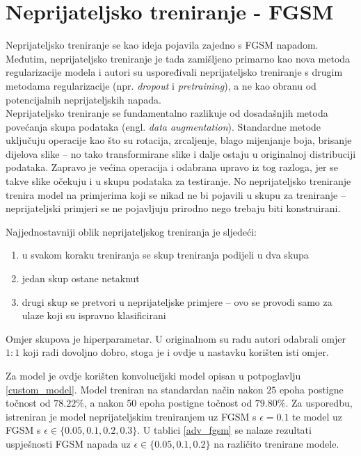 \documentclass[utf8, diplomski]{fer}
\begin{document}
\section{Neprijateljsko treniranje - FGSM}
Neprijateljsko treniranje se kao ideja pojavila zajedno s FGSM napadom\citep{Goodfellow2015ExplainingAH}. Međutim, neprijateljsko treniranje je tada zamišljeno primarno kao nova metoda regularizacije modela i autori su uspoređivali neprijateljsko treniranje s drugim metodama regularizacije (npr. \textit{dropout} i \textit{pretraining}), a ne kao obranu od potencijalnih neprijateljskih napada. \\
Neprijateljsko treniranje se fundamentalno razlikuje od dosadašnjih metoda povećanja skupa podataka (engl. \textit{data augmentation}). Standardne metode uključuju operacije kao što su rotacija, zrcaljenje, blago mijenjanje boja, brisanje dijelova slike -- no tako transformirane slike i dalje ostaju u originalnoj distribuciji podataka. Zapravo je većina operacija i odabrana upravo iz tog razloga, jer se takve slike očekuju i u skupu podataka za testiranje. No neprijateljsko treniranje trenira model na primjerima koji se nikad ne bi pojavili u skupu za treniranje -- neprijateljski primjeri se ne pojavljuju prirodno nego trebaju biti konstruirani. \par
Najjednostavniji oblik neprijateljskog treniranja je sljedeći:
\begin{enumerate}[noitemsep, label=\textbullet]
  \item u svakom koraku treniranja se skup treniranja podijeli u dva skupa
  \item jedan skup ostane netaknut
  \item drugi skup se pretvori u neprijateljske primjere -- ovo se provodi samo za ulaze koji su ispravno klasificirani
\end{enumerate} 
Omjer skupova je hiperparametar. U originalnom su radu autori odabrali omjer $1:1$ koji radi dovoljno dobro, stoga je i ovdje u nastavku korišten isti omjer.
\par
Za model je ovdje korišten konvolucijski model opisan u potpoglavlju \ref{custom_model}. Model treniran na standardan način nakon $25$ epoha postigne točnost od $78.22\%$, a nakon 50 epoha postigne točnost od $79.80\%$. Za usporedbu, istreniran je model neprijateljskim treniranjem uz FGSM s $\epsilon = 0.1$ te model uz FGSM s $\epsilon \in \{0.05, 0.1, 0.2, 0.3\}$. U tablici \ref{adv_fgsm} se nalaze rezultati uspješnosti FGSM napada uz $\epsilon \in \{0.05, 0.1, 0.2\}$ na različito trenirane modele.
\end{document}
